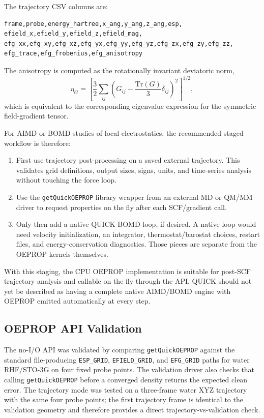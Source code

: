 \documentclass[journal=jcisd8,manuscript=suppinfo]{achemso}
\begin{document}
The trajectory CSV columns are:
\begin{verbatim}
frame,probe,energy_hartree,x_ang,y_ang,z_ang,esp,
efield_x,efield_y,efield_z,efield_mag,
efg_xx,efg_xy,efg_xz,efg_yx,efg_yy,efg_yz,efg_zx,efg_zy,efg_zz,
efg_trace,efg_frobenius,efg_anisotropy
\end{verbatim}
The anisotropy is computed as the rotationally invariant deviatoric norm,
\[
  \eta_G =
  \left[
    \frac{3}{2}
    \sum_{ij}\left(G_{ij}-\frac{\mathrm{Tr}(G)}{3}\delta_{ij}\right)^2
  \right]^{1/2},
\]
which is equivalent to the corresponding eigenvalue expression for the symmetric field-gradient tensor.

For AIMD or BOMD studies of local electrostatics, the recommended staged workflow is therefore:
\begin{enumerate}
  \item First use trajectory post-processing on a saved external trajectory.  This validates grid definitions, output sizes, signs, units, and time-series analysis without touching the force loop.
  \item Use the \texttt{getQuickOEPROP} library wrapper from an external MD or QM/MM driver to request properties on the fly after each SCF/gradient call.
  \item Only then add a native QUICK BOMD loop, if desired.  A native loop would need velocity initialization, an integrator, thermostat/barostat choices, restart files, and energy-conservation diagnostics.  Those pieces are separate from the OEPROP kernels themselves.
\end{enumerate}

With this staging, the CPU OEPROP implementation is suitable for post-SCF trajectory analysis and callable on the fly through the API.  QUICK should not yet be described as having a complete native AIMD/BOMD engine with OEPROP emitted automatically at every step.

\subsection{OEPROP API Validation}

The no-I/O API was validated by comparing \texttt{getQuickOEPROP} against the standard file-producing \texttt{ESP\_GRID}, \texttt{EFIELD\_GRID}, and \texttt{EFG\_GRID} paths for water RHF/STO-3G on four fixed probe points.  The validation driver also checks that calling \texttt{getQuickOEPROP} before a converged density returns the expected clean error.  The trajectory mode was tested on a three-frame water XYZ trajectory with the same four probe points; the first trajectory frame is identical to the validation geometry and therefore provides a direct trajectory-vs-validation check.
\end{document}
